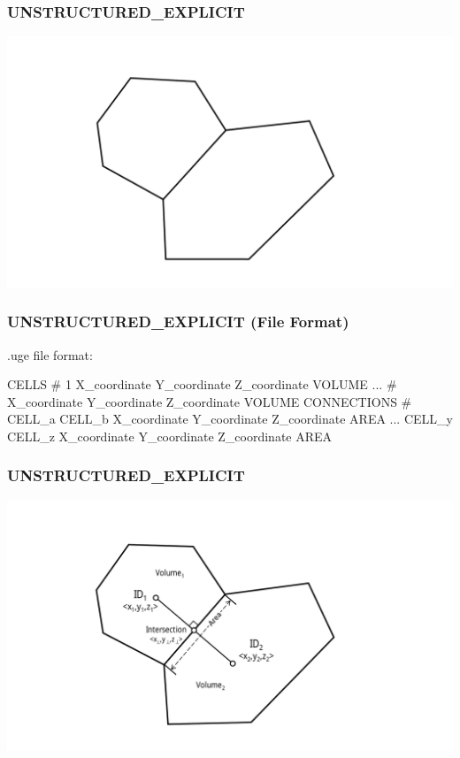 \documentclass{beamer}
\begin{document}
\begin{frame}[fragile]\frametitle{UNSTRUCTURED\_EXPLICIT}
\vspace{0.2in}
\centering
\includegraphics[width=0.9\linewidth]{./voronoi_geom}
\end{frame}

\begin{frame}\frametitle{UNSTRUCTURED\_EXPLICIT (File Format)}
.uge file format:
\begin{semiverbatim}
CELLS #
1 X\_coordinate Y\_coordinate Z\_coordinate VOLUME
...
# X\_coordinate Y\_coordinate Z\_coordinate VOLUME
CONNECTIONS #
CELL\_a CELL\_b X\_coordinate Y\_coordinate Z\_coordinate AREA
...
CELL\_y CELL\_z X\_coordinate Y\_coordinate Z\_coordinate AREA
\end{semiverbatim}

\end{frame}

\begin{frame}[fragile]\frametitle{UNSTRUCTURED\_EXPLICIT}
\vspace{0.2in}
\centering
\includegraphics[width=0.9\linewidth]{./voronoi_dual}
\end{frame}
\end{document}
